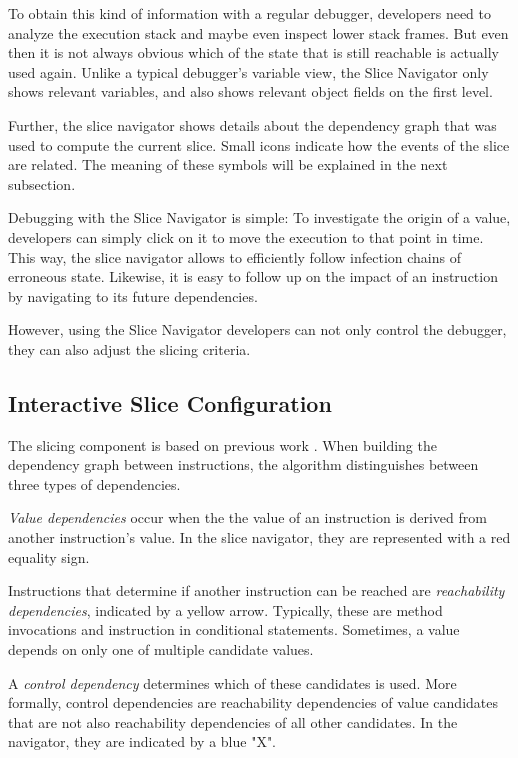 ﻿\documentclass[
      english,
			conference,
      ]{IEEEtran}
\newcommand{\todo}[2][]{\pdfmargincomment[color=orange,icon=Note,subject={TODO},author={#1}]{#2}}
\begin{document}
To obtain this kind of information with a regular debugger, developers need to analyze the execution stack and maybe even inspect lower stack frames.
But even then it is not always obvious which of the state that is still reachable is actually used again.
Unlike a typical debugger's variable view, the Slice Navigator only shows relevant variables, and also shows relevant object fields on the first level.

Further, the slice navigator shows details about the dependency graph that was used to compute the current slice.
Small icons indicate how the events of the slice are related.
The meaning of these symbols will be explained in the next subsection.

Debugging with the Slice Navigator is simple:
To investigate the origin of a value, developers can simply click on it to move the execution to that point in time.
This way, the slice navigator allows to efficiently follow infection chains of erroneous state.
Likewise, it is easy to follow up on the impact of an instruction by navigating to its future dependencies.

However, using the Slice Navigator developers can not only control the debugger, they can also adjust the slicing criteria.

\subsection{Interactive Slice Configuration}

The slicing component is based on previous work \todo{[xxx]}.
When building the dependency graph between instructions, the algorithm distinguishes between three types of dependencies.

\emph{Value dependencies} occur when the the value of an instruction is derived from another instruction's value.
In the slice navigator, they are represented with a red equality sign.

Instructions that determine if another instruction can be reached are \emph{reachability dependencies}, indicated by a yellow arrow.
Typically, these are method invocations and instruction in conditional statements.
Sometimes, a value depends on only one of multiple candidate values. 

A \emph{control dependency} determines which of these candidates is used.
More formally, control dependencies are reachability dependencies of value candidates that are not also reachability dependencies of all other candidates.
In the navigator, they are indicated by a blue "X".
\end{document}
